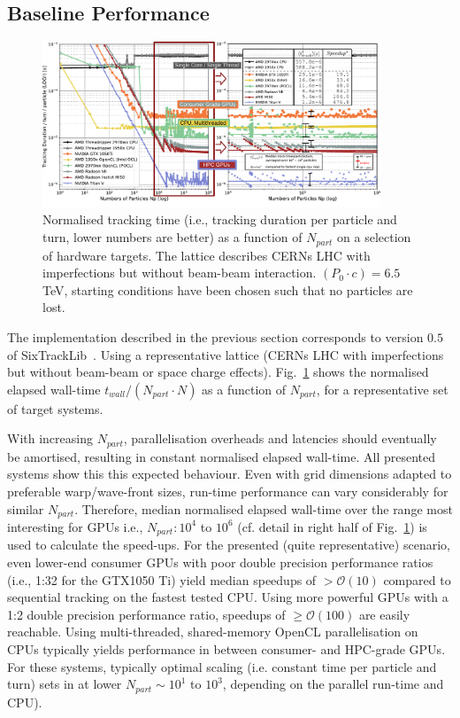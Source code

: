 \documentclass[a4paper,
               refpage,       %
               keeplastbox,   %
               ]{jacow}
\begin{document}
\subsection{Baseline Performance}
\begin{figure}[h!t]
    \centering
    \includegraphics*[width=0.9\textwidth]{fig_performance_baseline}
    \caption{Normalised tracking time (i.e., tracking duration per particle and turn, lower numbers are better) as a function of $N_{part}$ on a selection of hardware targets. The lattice describes CERNs LHC with imperfections but without beam-beam interaction. $(P_0\cdot c) = 6.5$ TeV, starting conditions have been chosen such that no particles are lost.}
    \label{fig:baseline_performance}
\end{figure}
The implementation described in the previous section corresponds to version $0.5$ of SixTrackLib~\cite{sixtracklib-repo-2021}. Using a representative lattice (CERNs LHC with imperfections but without beam-beam or space charge effects). Fig.~\ref{fig:baseline_performance} shows the normalised elapsed wall-time $t_{wall}/(N_{part}\cdot N)$ as a function of $N_{part}$,  for a representative set of target systems. 

With increasing $N_{part}$, parallelisation overheads and latencies should eventually be amortised, resulting in constant normalised elapsed wall-time. All presented systems show this this expected behaviour. Even with grid dimensions adapted to preferable warp/wave-front sizes, run-time performance can vary considerably for similar $N_{part}$. Therefore, median normalised elapsed wall-time over the range most interesting for GPUs i.e., $N_{part}: 10^4$ to $10^6$ (cf. detail in right half of Fig.~\ref{fig:baseline_performance}) is used to calculate the speed-ups. For the presented (quite representative) scenario, even lower-end consumer GPUs with poor double precision performance ratios (i.e., 1:32 for the GTX1050 Ti) yield median speedups of $>\mathcal{O}(10)$ compared to sequential tracking on the fastest tested CPU. Using more powerful GPUs with a 1:2 double precision performance ratio, speedups of $\geq \mathcal{O}(100)$ are easily reachable. Using multi-threaded, shared-memory OpenCL parallelisation on CPUs typically yields performance in between consumer- and HPC-grade GPUs. For these systems, typically optimal scaling (i.e. constant time per particle and turn) sets in at lower $N_{part} \sim 10^1$ to $10^3$, depending on the parallel run-time and CPU).
\end{document}

